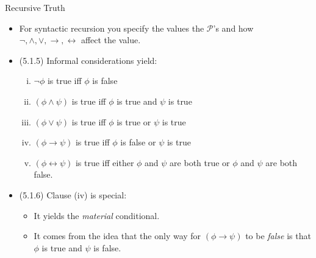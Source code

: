 \documentclass[../slides.tex]{subfiles}
\begin{document}
\begin{frame}{Recursive Truth}

	\begin{itemize}
	
			\item \alert{For syntactic recursion you specify the values the $\mathcal{P}$'s and how $\neg,\land,\lor,\to,\leftrightarrow$ affect the value.}
	
	
			\item (5.1.5) Informal considerations yield:
			
			\begin{enumerate}[(i)]
						
				\item $\neg\phi$ is true iff $\phi$ is false
					
				\item $(\phi\land\psi)$ is true iff $\phi$ is true and $\psi$ is true					
						
				\item $(\phi\lor\psi)$ is true iff $\phi$ is true or $\psi$ is true						
				
				\item  $(\phi\to\psi)$ is true iff $\phi$ is false or $\psi$ is true							
				
				\item $(\phi\leftrightarrow\psi)$ is true iff either $\phi$ and $\psi$ are both true or $\phi$ and $\psi$ are both false.			
					
				\end{enumerate}
				
			\item (5.1.6) Clause (iv) is special:
			
				\begin{itemize}
				
					\item It yields the \emph{material} conditional.
					
					\item It comes from the idea that the only way for $(\phi\to\psi)$ to be \emph{false} is that $\phi$ is true and $\psi$ is false.
			
				\end{itemize}
	
	\end{itemize}

\end{frame}
\end{document}

